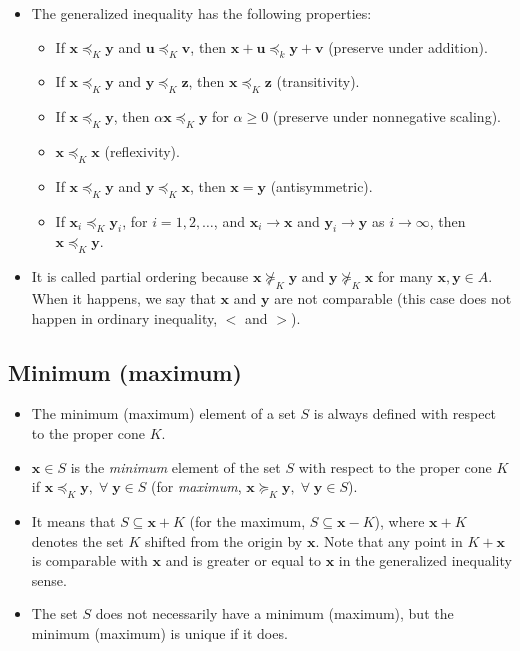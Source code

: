 \documentclass{article}
\begin{document}
\begin{itemize}
    \item The generalized inequality has the following properties:
    \begin{itemize}[label={$\triangleright$}]
        \item If \(\mathbf{x} \preceq_K \mathbf{y}\) and \(\mathbf{u} \preceq_K \mathbf{v}\), then \(\mathbf{x} + \mathbf{u} \preceq_k \mathbf{y} + \mathbf{v}\) (preserve under addition).
        \item If \(\mathbf{x} \preceq_K \mathbf{y}\) and \(\mathbf{y} \preceq_K \mathbf{z}\), then \(\mathbf{x} \preceq_K \mathbf{z}\) (transitivity).
        \item If \(\mathbf{x}\preceq_K \mathbf{y}\), then \(\alpha\mathbf{x}\preceq_K \mathbf{y}\) for \(\alpha\geq0\) (preserve under nonnegative scaling).
        \item \(\mathbf{x}\preceq_K \mathbf{x}\) (reflexivity).
        \item If \(\mathbf{x}\preceq_K \mathbf{y}\) and \(\mathbf{y}\preceq_K \mathbf{x}\), then \(\mathbf{x} = \mathbf{y}\) (antisymmetric).
        \item If \(\mathbf{x}_i\preceq_K \mathbf{y}_i\), for \(i = 1, 2, \dots\), and \(\mathbf{x}_i \rightarrow \mathbf{x}\) and \(\mathbf{y}_i \rightarrow \mathbf{y}\) as \(i \rightarrow \infty\), then \(\mathbf{x} \preceq_K \mathbf{y}\).
    \end{itemize}
    \item It is called partial ordering because \(\mathbf{x} \nsucceq_K \mathbf{y}\) and \(\mathbf{y} \nsucceq_K \mathbf{x}\) for many \(\mathbf{x}, \mathbf{y} \in A\). When it happens, we say that \(\mathbf{x}\) and \(\mathbf{y}\) are not comparable (this case does not happen in ordinary inequality, \(<\) and \(>\)).
\end{itemize}
\subsection{Minimum (maximum)}
\begin{itemize}
    \item The minimum (maximum) element of a set \(S\) is always defined with respect to the proper cone \(K\).
    \item \(\mathbf{x} \in S\) is the \emph{minimum} element of the set \(S\) with respect to the proper cone \(K\) if \(\mathbf{x} \preceq_K \mathbf{y}, \;\forall\;\mathbf{y} \in S\) (for \emph{maximum}, \(\mathbf{x} \succeq_K \mathbf{y}, \;\forall\;\mathbf{y} \in S\)).
    \item It means that \(S \subseteq \mathbf{x} + K\) (for the maximum, \(S \subseteq \mathbf{x} - K\)), where \(\mathbf{x} + K\) denotes the set \(K\) shifted from the origin by \(\mathbf{x}\). Note that any point in \(K+\mathbf{x}\) is comparable with \(\mathbf{x}\) and is greater or equal to \(\mathbf{x}\) in the generalized inequality sense.
    \item The set \(S\) does not necessarily have a minimum (maximum), but the minimum (maximum) is unique if it does.
\end{itemize}
\end{document}
